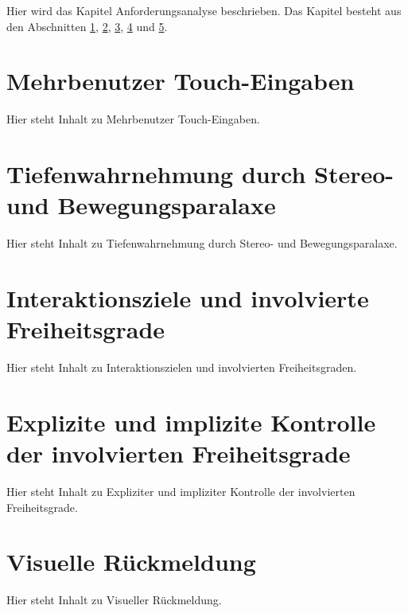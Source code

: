 Hier wird das Kapitel Anforderungsanalyse beschrieben. Das Kapitel besteht aus den Abschnitten \ref{sec:mehrbenutzer_touch_eingaben}, \ref{sec:tiefenwahrnehmung}, \ref{sec:interaktionsziele_und_freiheitsgrade}, \ref{sec:kontrolle_der_freiheitsgrade} und \ref{sec:visuelle_rueckmeldung}.


\section{Mehrbenutzer Touch-Eingaben}
\label{sec:mehrbenutzer_touch_eingaben}

Hier steht Inhalt zu Mehrbenutzer Touch-Eingaben.


\section{Tiefenwahrnehmung durch Stereo- und Bewegungsparalaxe}
\label{sec:tiefenwahrnehmung}

Hier steht Inhalt zu Tiefenwahrnehmung durch Stereo- und Bewegungsparalaxe. 


\section{Interaktionsziele und involvierte Freiheitsgrade}
\label{sec:interaktionsziele_und_freiheitsgrade}

Hier steht Inhalt zu Interaktionszielen und involvierten Freiheitsgraden. 


\section{Explizite und implizite Kontrolle der involvierten Freiheitsgrade}
\label{sec:kontrolle_der_freiheitsgrade}

Hier steht Inhalt zu Expliziter und impliziter Kontrolle der involvierten Freiheitsgrade.


\section{Visuelle Rückmeldung}
\label{sec:visuelle_rueckmeldung}

Hier steht Inhalt zu Visueller Rückmeldung. 